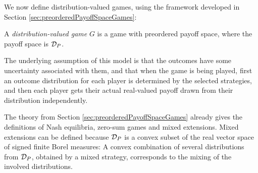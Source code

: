 \documentclass[a4paper]{scrreprt}
\begin{document}

    We now define distribution-valued games, using the framework developed in Section \ref{sec:preorderedPayoffSpaceGames}:
    \begin{defn}
        A \emph{distribution-valued game} $G$ is a game with preordered payoff space, where the payoff space is $\mathcal{D}_P$.
        \label{def:distributionValuedGame}
    \end{defn}
    The underlying assumption of this model is that the outcomes have some uncertainty associated with them, and that when the game is being played, first an outcome distribution for each player is determined by the selected strategies, and then each player gets their actual real-valued payoff drawn from their distribution independently.

    The theory from Section \ref{sec:preorderedPayoffSpaceGames} already gives the definitions of Nash equilibria, zero-sum games and mixed extensions. 
    Mixed extensions can be defined because $\mathcal{D}_P$ is a convex subset of the real vector space of signed finite Borel measures: A convex combination of several distributions from $\mathcal{D}_P$, obtained by a mixed strategy, corresponds to the mixing of the involved distributions.
    
\end{document}
